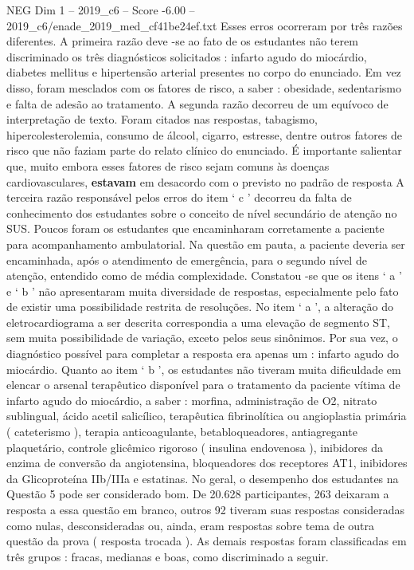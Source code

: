\begin{textsample}{NEG Dim 1 – 2019\_c6 – Score -6.00 – 2019\_c6/enade\_2019\_med\_cf41be24ef.txt}
Esses erros ocorreram por três razões diferentes.
A primeira razão deve -se ao fato de os estudantes não terem discriminado os três diagnósticos solicitados : infarto agudo do miocárdio, diabetes mellitus e hipertensão arterial presentes no corpo do enunciado.
Em vez disso, foram mesclados com os fatores de risco, a saber : obesidade, sedentarismo e falta de adesão ao tratamento.
A segunda razão decorreu de um equívoco de interpretação de texto.
Foram citados nas respostas, tabagismo, hipercolesterolemia, consumo de álcool, cigarro, estresse, dentre outros fatores de risco que não faziam parte do relato clínico do enunciado.
É importante salientar que, muito embora esses fatores de risco sejam comuns às doenças cardiovasculares, \textbf{estavam} em desacordo com o previsto no padrão de resposta A terceira razão responsável pelos erros do item ‘ c ’ decorreu da falta de conhecimento dos estudantes sobre o conceito de nível secundário de atenção no SUS.
Poucos foram os estudantes que encaminharam corretamente a paciente para acompanhamento ambulatorial.
Na questão em pauta, a paciente deveria ser encaminhada, após o atendimento de emergência, para o segundo nível de atenção, entendido como de média complexidade.
Constatou -se que os itens ‘ a ’ e ‘ b ’ não apresentaram muita diversidade de respostas, especialmente pelo fato de existir uma possibilidade restrita de resoluções.
No item ‘ a ’, a alteração do eletrocardiograma a ser descrita correspondia a uma elevação de segmento ST, sem muita possibilidade de variação, exceto pelos seus sinônimos.
Por sua vez, o diagnóstico possível para completar a resposta era apenas um : infarto agudo do miocárdio.
Quanto ao item ‘ b ’, os estudantes não tiveram muita dificuldade em elencar o arsenal terapêutico disponível para o tratamento da paciente vítima de infarto agudo do miocárdio, a saber : morfina, administração de O2, nitrato sublingual, ácido acetil salicílico, terapêutica fibrinolítica ou angioplastia primária ( cateterismo ), terapia anticoagulante, betabloqueadores, antiagregante plaquetário, controle glicêmico rigoroso ( insulina endovenosa ), inibidores da enzima de conversão da angiotensina, bloqueadores dos receptores AT1, inibidores da Glicoproteína IIb/IIIa e estatinas.
No geral, o desempenho dos estudantes na Questão 5 pode ser considerado bom.
De 20.628 participantes, 263 deixaram a resposta a essa questão em branco, outros 92 tiveram suas respostas consideradas como nulas, desconsideradas ou, ainda, eram respostas sobre tema de outra questão da prova ( resposta trocada ).
As demais respostas foram classificadas em três grupos : fracas, medianas e boas, como discriminado a seguir.

\end{textsample}
